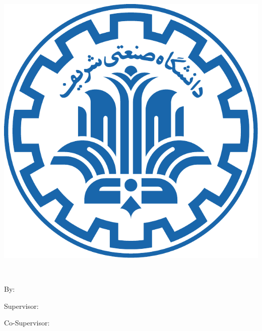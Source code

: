 

\begin{center}

\begin{latin}

\includegraphics[scale=0.25]{front/template/images/logo}

\EnglishThesisUniversity \\
\EnglishThesisDepartment

\begin{large}
\vspace{0.7cm}
\EnglishThesisDegree{}


\vspace{1.5cm}

{\Large\textbf\EnglishThesisTitle}

\vspace{1.5cm}

{\normalsize By:}\\
\textbf{\EnglishThesisAuthor}

\vspace{1cm}

{\normalsize Supervisor:}\\ 
\textbf{\EnglishThesisSupervisor}

\vspace{1cm}

{\normalsize Co-Supervisor:}\\ 
\textbf{\EnglishSecondSupervisor}

\end{large}

\vspace{1.5cm}
\EnglishThesisDate

\end{latin}

\end{center}
